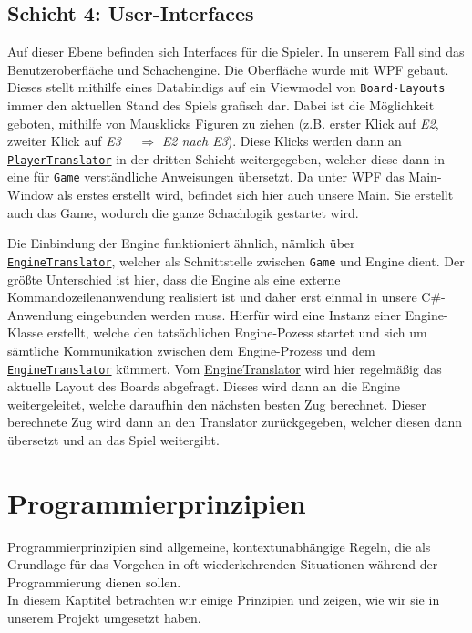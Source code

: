 \documentclass[
10pt, %
a4paper, %
oneside, %
headinclude,footinclude, %
BCOR5mm, %
]{scrartcl}
\begin{document}
\begin{onehalfspace}
\subsection{Schicht 4: User-Interfaces}
Auf dieser Ebene befinden sich Interfaces für die Spieler. In unserem Fall sind das Benutzeroberfläche und Schachengine. Die Oberfläche wurde mit WPF gebaut. Dieses stellt mithilfe eines Databindigs auf ein Viewmodel von \texttt{Board-Layouts} immer den aktuellen Stand des Spiels grafisch dar. 
Dabei ist die Möglichkeit geboten, mithilfe von Mausklicks Figuren zu ziehen (z.B. erster Klick auf \textit{E2}, zweiter Klick auf \textit{E3}~~ $\Rightarrow$ \textit{E2 nach E3}). Diese Klicks werden dann an \texttt{\href{https://github.com/schmida736/Chess-AdvancedSE/blob/main/Chess-AdvancedSE/Translators/PlayerTranslator.cs}{PlayerTranslator}} in der dritten Schicht weitergegeben, welcher diese dann in eine für \texttt{Game} verständliche Anweisungen übersetzt.
Da unter WPF das Main-Window als erstes erstellt wird, befindet sich hier auch unsere Main. Sie erstellt auch das Game, wodurch die ganze Schachlogik gestartet wird.

Die Einbindung der Engine funktioniert ähnlich, nämlich über \texttt{\href{https://github.com/schmida736/Chess-AdvancedSE/blob/main/Chess-AdvancedSE/Translators/EngineTranslator.cs}{EngineTranslator}}, welcher als Schnittstelle zwischen \texttt{Game} und Engine dient. Der größte Unterschied ist hier, dass die Engine als eine externe Kommandozeilenanwendung realisiert ist und daher erst einmal in unsere C\#-Anwendung eingebunden werden muss.
Hierfür wird eine Instanz einer Engine-Klasse erstellt, welche den tatsächlichen Engine-Pozess startet und sich um sämtliche Kommunikation zwischen dem Engine-Prozess und dem \texttt{\href{https://github.com/schmida736/Chess-AdvancedSE/blob/main/Chess-AdvancedSE/Translators/EngineTranslator.cs}{EngineTranslator}} kümmert. Vom \href{https://github.com/schmida736/Chess-AdvancedSE/blob/main/Chess-AdvancedSE/Translators/EngineTranslator.cs}{EngineTranslator} wird hier regelmäßig das aktuelle Layout des Boards abgefragt. Dieses wird dann an die Engine weitergeleitet, welche daraufhin den nächsten besten Zug berechnet. Dieser berechnete Zug wird dann an den Translator zurückgegeben, welcher diesen dann übersetzt und an das Spiel weitergibt.
\newpage
\section{Programmierprinzipien}
Programmierprinzipien sind allgemeine, kontextunabhängige Regeln, die als Grundlage für das Vorgehen in oft wiederkehrenden Situationen während der Programmierung dienen sollen.\\
In diesem Kaptitel betrachten wir einige Prinzipien und zeigen, wie wir sie in unserem Projekt umgesetzt haben.

\end{onehalfspace}
\end{document}
